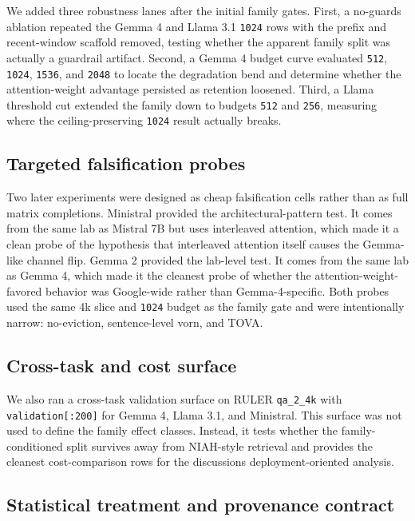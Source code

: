 \documentclass[10pt]{article}
\begin{document}
We added three robustness lanes after the initial family gates. First, a
no-guards ablation repeated the Gemma 4 and Llama 3.1 \texttt{1024} rows
with the prefix and recent-window scaffold removed, testing whether the
apparent family split was actually a guardrail artifact. Second, a Gemma
4 budget curve evaluated \texttt{512}, \texttt{1024}, \texttt{1536}, and
\texttt{2048} to locate the degradation bend and determine whether the
attention-weight advantage persisted as retention loosened. Third, a
Llama threshold cut extended the family down to budgets \texttt{512} and
\texttt{256}, measuring where the ceiling-preserving \texttt{1024}
result actually breaks.

\subsection{Targeted falsification probes}\label{43-targeted-falsification-probes}

Two later experiments were designed as cheap falsification cells rather
than as full matrix completions. Ministral provided the
architectural-pattern test. It comes from the same lab as Mistral 7B but
uses interleaved attention, which made it a clean probe of the
hypothesis that interleaved attention itself causes the Gemma-like
channel flip. Gemma 2 provided the lab-level test. It comes from the
same lab as Gemma 4, which made it the cleanest probe of whether the
attention-weight-favored behavior was Google-wide rather than
Gemma-4-specific. Both probes used the same 4k slice and \texttt{1024}
budget as the family gate and were intentionally narrow: no-eviction,
sentence-level vorn, and TOVA.

\subsection{Cross-task and cost surface}\label{44-cross-task-and-cost-surface}

We also ran a cross-task validation surface on RULER \texttt{qa\_2\_4k}
with \texttt{validation{[}:200{]}} for Gemma 4, Llama 3.1, and Ministral.
This surface was not used to define the family effect classes.
Instead, it tests whether the family-conditioned split survives away
from NIAH-style retrieval and provides the cleanest cost-comparison rows
for the discussion\textquotesingle s deployment-oriented analysis.

\subsection{Statistical treatment and provenance contract}\label{45-statistical-treatment-and-provenance-contract}
\end{document}
